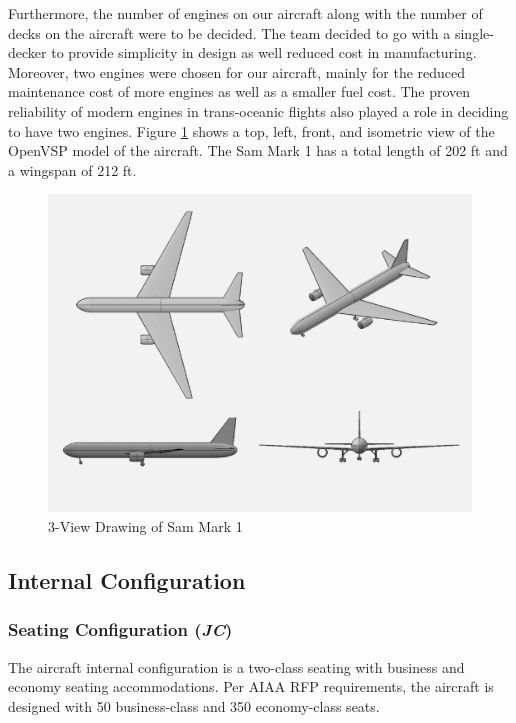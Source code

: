 \newpage

Furthermore, the number of engines on our aircraft along with the number of decks on the aircraft were to be decided. The team decided to go with a single-decker to provide simplicity in design as well reduced cost in manufacturing. Moreover, two engines were chosen for our aircraft, mainly for the reduced maintenance cost of more engines as well as a smaller fuel cost. The proven reliability of modern engines in trans-oceanic flights also played a role in deciding to have two engines. Figure \ref{fig3view} shows a top, left, front, and isometric view of the OpenVSP model of the aircraft. The Sam Mark 1 has a total length of 202 ft and a wingspan of 212 ft. 

\begin{figure}[H]
        \centering
        \includegraphics[width=0.75\linewidth]{Photos/3-View_Aircraft_(2-12-20).pdf}
        \caption{3-View Drawing of Sam Mark 1}
        \label{fig3view}
        \end{figure}

\subsection{Internal Configuration}
\subsubsection{Seating Configuration (\textit{JC})}
The aircraft internal configuration is a two-class seating with business and economy seating accommodations.  Per AIAA RFP requirements, the aircraft is designed with 50 business-class and 350 economy-class seats.

